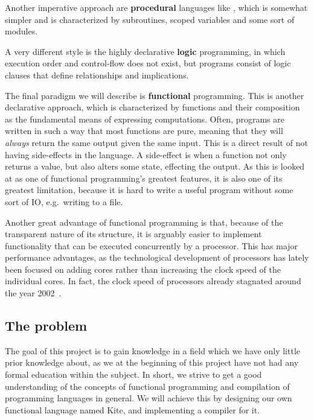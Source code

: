 Another imperative approach are \textbf{procedural} languages like , which is somewhat simpler and is characterized by subroutines, scoped variables and some sort of modules.

A very different style is the highly declarative \textbf{logic} programming, in which execution order and control-flow does not exist, but programs consist of logic clauses that define relationships and implications.

The final paradigm we will describe is \textbf{functional} programming. This is another declarative approach, which is characterized by functions and their composition as the fundamental means of expressing computations. Often, programs are written in such a way that most functions are pure, meaning that they will \emph{always} return the same output given the same input. This is a direct result of not having side-effects in the language. A side-effect is when a function not only returns a value, but also alters some state, effecting the output. As this is looked at as one of functional programming's greatest features, it is also one of its greatest limitation, because it is hard to write a useful program without some sort of IO, e.g.\ writing to a file.

Another great advantage of functional programming is that, because of the transparent nature of its structure, it is arguably easier to implement functionality that can be executed concurrently by a processor. This has major performance advantages, as the technological development of processors has lately been focused on adding cores rather than increasing the clock speed of the individual cores. In fact, the clock speed of processors already stagnated around the year 2002~\cite{sutter09}.


\subsection{The problem}
The goal of this project is to gain knowledge in a field which we have only little prior knowledge about, as we at the beginning of this project have not had any formal education within the subject. In short, we strive to get a good understanding of the concepts of functional programming and compilation of programming languages in general. We will achieve this by designing our own functional language named Kite, and implementing a compiler for it.


